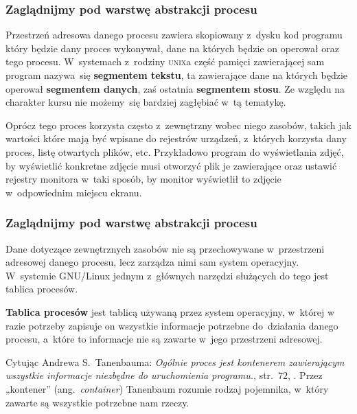 \documentclass[10pt,t]{beamer}
\begin{document}
\begin{frame}
  \frametitle{Zaglądnijmy pod warstwę abstrakcji procesu}


  Przestrzeń adresowa danego procesu zawiera skopiowany z~dysku kod programu
  który będzie dany proces wykonywał, dane na których będzie on operował
  oraz
  tego procesu. W~systemach z~rodziny \textsc{unix}a część pamięci
  zawierającej sam program nazywa~się \textbf{segmentem tekstu},
  ta zawierające dane na których będzie operował \textbf{segmentem danych},
  zaś ostatnia \textbf{segmentem stosu}. Ze względu na charakter kursu nie
  możemy~się bardziej zagłębiać w~tą tematykę.

  Oprócz tego proces korzysta często z~zewnętrzny wobec niego zasobów,
  takich jak wartości które mają być wpisane do rejestrów urządzeń,
  z~których korzysta dany proces, listę otwartych plików, etc. Przykładowo
  program do wyświetlania zdjęć, by wyświetlić konkretne zdjęcie musi
  otworzyć plik je zawierające oraz ustawić rejestry monitora w~taki
  sposób, by monitor wyświetlił to zdjęcie w~odpowiednim miejscu ekranu.

\end{frame}





\begin{frame}
  \frametitle{Zaglądnijmy pod warstwę abstrakcji procesu}


  Dane dotyczące zewnętrznych zasobów \alert{nie} są przechowywane
  w~przestrzeni adresowej danego procesu, lecz zarządza nimi sam system
  operacyjny. W~systemie GNU/Linux jednym z~głównych narzędzi
  służących do tego jest tablica procesów.

  \textbf{Tablica procesów} jest tablicą używaną przez system operacyjny,
  w~której w razie potrzeby zapisuje on wszystkie informacje potrzebne
  do~działania danego procesu, a~które to informacje nie są zawarte w~jego
  przestrzeni adresowej.

  Cytując Andrewa S.~Tanenbauma: \textit{Ogólnie proces jest kontenerem
    zawierającym wszystkie informacje niezbędne do uruchomienia programu.},
  str.~$72$, \parencite{Tannenbaum-Systemy-operacyjne-Wydanie-III-Pub-2013}.
  Przez „kontener” (ang.~\textit{container}) Tanenbaum rozumie rodzaj
  pojemnika, w~który zawarte są wszystkie potrzebne nam rzeczy.

\end{frame}
\end{document}
